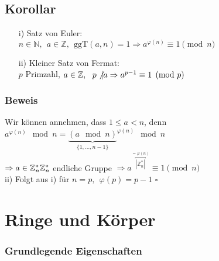 \documentclass[12pt,titlepage, pdf]{article}
\renewcommand{\>}{\rightarrow}
\renewcommand{\*}{\cdot}
\renewcommand{\phi}{\varphi}
\begin{document}
\subsection{Korollar}
\begin{itemize}
	\item[i)] Satz von Euler:\\ $n \in \mathbb{N},~~ a \in \mathbb{Z},~~ \text{ggT}(a,n) = 1 \Rightarrow a^{\phi(n)} \equiv 1 \pmod{n}$
	\item[ii)] Kleiner Satz von Fermat:\\ $p$ Primzahl, $a \in \mathbb{Z},~~ p \not\vert a \Rightarrow a^{p-1} \equiv 1 \pmod{p}$
\end{itemize}
\subsubsection*{Beweis}
Wir können annehmen, dass $1 \leq a < n$, denn \\$a^{\phi(n)} \mod n = {\underbrace{(a \mod n)}_{\{1,...,n-1\}}}^{\phi(n)}\mod n$ \\
$\Rightarrow a \in \mathbb{Z}^*_n \\
\mathbb{Z}^*_n$ endliche Gruppe $\Rightarrow a^{\overbracket{|\mathbb{Z}^*_n|}^{ = \phi(n)}} \equiv 1 \pmod{n}$\\
ii) Folgt aus i) für $n = p,~~ \phi(p) = p-1$
\hfill$\square$
\newpage
\section{Ringe und Körper}
\subsubsection*{Grundlegende Eigenschaften}
\end{document}
